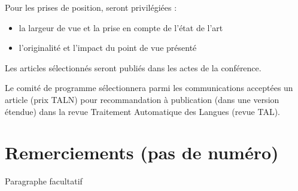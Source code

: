 \documentclass[10pt,a4paper,twoside]{article}
\begin{document}
Pour les prises de position, seront privilégiées :
\begin{itemize}
 \item   la largeur de vue et la prise en compte de l’état de l’art
 \item   l’originalité et l’impact du point de vue présenté
\end{itemize}

Les articles sélectionnés seront publiés dans les actes de la conférence.

Le comité de programme sélectionnera parmi les communications acceptées un article (prix TALN) pour recommandation à publication (dans une version étendue) dans la revue Traitement Automatique des Langues (revue
TAL).


\section*{Remerciements (pas de numéro)}

Paragraphe facultatif



\nocite{TALN2014,LaigneletRioult09,LanglaisPatry07,SeretanWehrli07}

\end{document}
